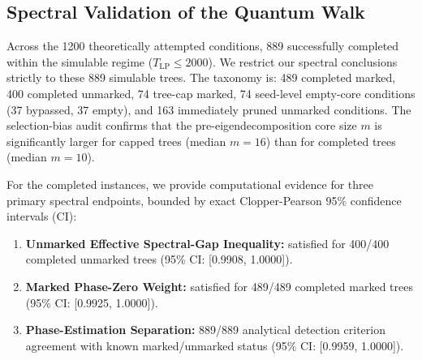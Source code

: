 \documentclass[conference]{IEEEtran} \IEEEoverridecommandlockouts
\begin{document}
\begin{table}[htbp]
\caption{Average Core Ratio $\alpha = m/n$ by Instance Type}
\label{tab:fixing}
\begin{center}
\end{center}
\end{table}

\subsection{Spectral Validation of the Quantum Walk}
Across the 1200 theoretically attempted conditions, 889 successfully completed within the simulable regime ($T_{\text{LP}} \le 2000$). We restrict our spectral conclusions strictly to these 889 simulable trees. The taxonomy is: 489 completed marked, 400 completed unmarked, 74 tree-cap marked, 74 seed-level empty-core conditions (37 bypassed, 37 empty), and 163 immediately pruned unmarked conditions. The selection-bias audit confirms that the pre-eigendecomposition core size $m$ is significantly larger for capped trees (median $m=16$) than for completed trees (median $m=10$).

For the completed instances, we provide computational evidence for three primary spectral endpoints, bounded by exact Clopper-Pearson 95\% confidence intervals (CI):
\begin{enumerate}
    \item \textbf{Unmarked Effective Spectral-Gap Inequality:} satisfied for 400/400 completed unmarked trees (95\% CI: [0.9908, 1.0000]).
    \item \textbf{Marked Phase-Zero Weight:} satisfied for 489/489 completed marked trees (95\% CI: [0.9925, 1.0000]).
    \item \textbf{Phase-Estimation Separation:} 889/889 analytical detection criterion agreement with known marked/unmarked status (95\% CI: [0.9959, 1.0000]).
\end{enumerate}
\end{document}
